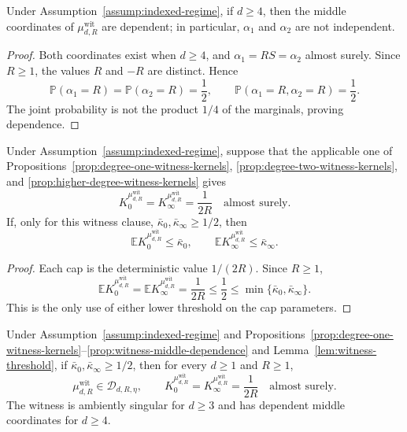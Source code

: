 \begin{proposition}
\label{prop:witness-middle-dependence}
Under Assumption~\ref{assump:indexed-regime}, if $d\geq4$, then the middle
coordinates of $\mu^{\mathrm{wit}}_{d,R}$ are dependent; in particular,
$\alpha_1$ and $\alpha_2$ are not independent.
\end{proposition}

\begin{proof}
Both coordinates exist when $d\geq4$, and
$\alpha_1=RS=\alpha_2$ almost surely.  Since $R\geq1$, the values $R$ and
$-R$ are distinct.  Hence
\[
\mathbb P(\alpha_1=R)=\mathbb P(\alpha_2=R)=\frac12,
\qquad
\mathbb P(\alpha_1=R,\alpha_2=R)=\frac12.
\]
The joint probability is not the product $1/4$ of the marginals, proving
dependence.
\end{proof}

\begin{lemma}
\label{lem:witness-threshold}
Under Assumption~\ref{assump:indexed-regime}, suppose that the applicable
one of Propositions~\ref{prop:degree-one-witness-kernels},
\ref{prop:degree-two-witness-kernels}, and
\ref{prop:higher-degree-witness-kernels} gives
\[
K_0^{\mu^{\mathrm{wit}}_{d,R}}
=K_\infty^{\mu^{\mathrm{wit}}_{d,R}}
=\frac1{2R}\quad\text{almost surely}.
\]
If, only for this witness clause,
$\bar\kappa_0,\bar\kappa_\infty\geq1/2$, then
\[
\mathbb E K_0^{\mu^{\mathrm{wit}}_{d,R}}\leq\bar\kappa_0,
\qquad
\mathbb E K_\infty^{\mu^{\mathrm{wit}}_{d,R}}\leq\bar\kappa_\infty.
\]
\end{lemma}

\begin{proof}
Each cap is the deterministic value $1/(2R)$.  Since $R\geq1$,
\[
\mathbb E K_0^{\mu^{\mathrm{wit}}_{d,R}}
=\mathbb E K_\infty^{\mu^{\mathrm{wit}}_{d,R}}
=\frac1{2R}
\leq\frac12
\leq\min\{\bar\kappa_0,\bar\kappa_\infty\}.
\]
This is the only use of either lower threshold on the cap parameters.
\end{proof}

\begin{proposition}
\label{prop:witness-membership}
Under Assumption~\ref{assump:indexed-regime} and
Propositions~\ref{prop:degree-one-witness-kernels}--\ref{prop:witness-middle-dependence}
and Lemma~\ref{lem:witness-threshold}, if
$\bar\kappa_0,\bar\kappa_\infty\geq1/2$, then for every $d\geq1$ and
$R\geq1$,
\[
\mu^{\mathrm{wit}}_{d,R}\in\mathcal D_{d,R,\eta},
\qquad
K_0^{\mu^{\mathrm{wit}}_{d,R}}
=K_\infty^{\mu^{\mathrm{wit}}_{d,R}}
=\frac1{2R}\quad\text{almost surely}.
\]
The witness is ambiently singular for $d\geq3$ and has dependent middle
coordinates for $d\geq4$.
\end{proposition}

